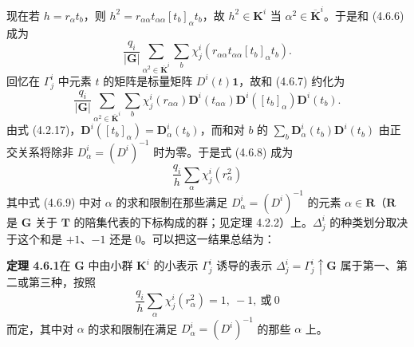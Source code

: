 现在若 $h = r_{\alpha}t_{b}$，则 $h^{2} = r_{\alpha\alpha}t_{\alpha\alpha}[t_{b}]_{\alpha}t_{b}$，故 $h^{2} \in \mathbf{K}^{i}$ 当 $\alpha^{2} \in \overline{\mathbf{K}}^{i}$。于是和 (4.6.6) 成为
\begin{equation*}
\frac{q_{i}}{|\mathbf{G}|}\sum_{\alpha^{2} \in \overline{\mathbf{K}}^{i}}\sum_{b}\chi^{i}_{j}(r_{\alpha\alpha}t_{\alpha\alpha}[t_{b}]_{\alpha}t_{b}).
\tag{4.6.7}
\end{equation*}
回忆在 $\Gamma^{i}_{j}$ 中元素 $t$ 的矩阵是标量矩阵 $D^{i}(t)\mathbf{1}$，故和 (4.6.7) 约化为
\begin{equation*}
\frac{q_{i}}{|\mathbf{G}|}\sum_{\alpha^{2} \in \overline{\mathbf{K}}^{i}}\sum_{b}\chi^{i}_{j}(r_{\alpha\alpha})\mathbf{D}^{i}(t_{\alpha\alpha})\mathbf{D}^{i}([t_{b}]_{\alpha})\mathbf{D}^{i}(t_{b}).
\tag{4.6.8}
\end{equation*}
由式 (4.2.17)，$\mathbf{D}^{i}([t_{b}]_{\alpha}) = \mathbf{D}^{i}_{\alpha}(t_{b})$，而和对 $b$ 的 $\sum_{b}\mathbf{D}^{i}_{\alpha}(t_{b})\mathbf{D}^{i}(t_{b})$ 由正交关系将除非 $D^{i}_{\alpha} = (D^{i})^{-1}$ 时为零。于是式 (4.6.8) 成为
\begin{equation*}
\frac{q_{i}}{h}\sum_{\alpha}\chi^{i}_{j}(r^{2}_{\alpha})
\tag{4.6.9}
\end{equation*}
其中式 (4.6.9) 中对 $\alpha$ 的求和限制在那些满足 $D^{i}_{\alpha} = (D^{i})^{-1}$ 的元素 $\alpha \in \mathbf{R}$（$\mathbf{R}$ 是 $\mathbf{G}$ 关于 $\mathbf{T}$ 的陪集代表的下标构成的群；见定理 4.2.2）上。$\Delta^{i}_{j}$ 的种类划分取决于这个和是 $+1$、$-1$ 还是 $0$。可以把这一结果总结为：

\noindent\textbf{定理 4.6.1}\quad 在 $\mathbf{G}$ 中由小群 $\mathbf{K}^{i}$ 的小表示 $\Gamma^{i}_{j}$ 诱导的表示 $\Delta^{i}_{j} = \Gamma^{i}_{j} \uparrow \mathbf{G}$ 属于第一、第二或第三种，按照
\begin{equation*}
\frac{q_{i}}{h}\sum_{\alpha}\chi^{i}_{j}(r^{2}_{\alpha}) = 1,\ -1,\ \text{或}\ 0
\tag{4.6.10}
\end{equation*}
而定，其中对 $\alpha$ 的求和限制在满足 $D^{i}_{\alpha} = (D^{i})^{-1}$ 的那些 $\alpha$ 上。

